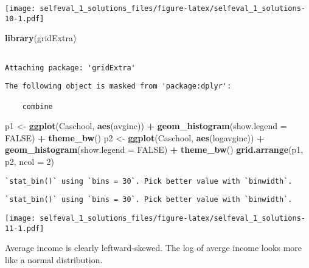 \documentclass[12pt,]{article}
\newenvironment{Shaded}{\begin{snugshade}}{\end{snugshade}}
\newcommand{\DataTypeTok}[1]{\textcolor[rgb]{0.13,0.29,0.53}{#1}}
\newcommand{\DecValTok}[1]{\textcolor[rgb]{0.00,0.00,0.81}{#1}}
\newcommand{\KeywordTok}[1]{\textcolor[rgb]{0.13,0.29,0.53}{\textbf{#1}}}
\newcommand{\NormalTok}[1]{#1}
\newcommand{\OperatorTok}[1]{\textcolor[rgb]{0.81,0.36,0.00}{\textbf{#1}}}
\newcommand{\OtherTok}[1]{\textcolor[rgb]{0.56,0.35,0.01}{#1}}
\newcommand{\StringTok}[1]{\textcolor[rgb]{0.31,0.60,0.02}{#1}}
\begin{document}
\texttt{[image: selfeval\_1\_solutions\_files/figure-latex/selfeval\_1\_solutions-10-1.pdf]}

\begin{Shaded}
\begin{Highlighting}[]
\KeywordTok{library}\NormalTok{(gridExtra)}
\end{Highlighting}
\end{Shaded}

\begin{verbatim}

Attaching package: 'gridExtra'
\end{verbatim}

\begin{verbatim}
The following object is masked from 'package:dplyr':

    combine
\end{verbatim}

\begin{Shaded}
\begin{Highlighting}[]
\NormalTok{p1 <-}\StringTok{ }\KeywordTok{ggplot}\NormalTok{(Caschool, }\KeywordTok{aes}\NormalTok{(avginc)) }\OperatorTok{+}
\StringTok{  }\KeywordTok{geom_histogram}\NormalTok{(}\DataTypeTok{show.legend =} \OtherTok{FALSE}\NormalTok{) }\OperatorTok{+}
\StringTok{  }\KeywordTok{theme_bw}\NormalTok{()}
\NormalTok{p2 <-}\StringTok{ }\KeywordTok{ggplot}\NormalTok{(Caschool, }\KeywordTok{aes}\NormalTok{(logavginc)) }\OperatorTok{+}
\StringTok{  }\KeywordTok{geom_histogram}\NormalTok{(}\DataTypeTok{show.legend =} \OtherTok{FALSE}\NormalTok{) }\OperatorTok{+}
\StringTok{  }\KeywordTok{theme_bw}\NormalTok{()}
\KeywordTok{grid.arrange}\NormalTok{(p1, p2,  }
             \DataTypeTok{ncol =} \DecValTok{2}\NormalTok{)  }
\end{Highlighting}
\end{Shaded}

\begin{verbatim}
`stat_bin()` using `bins = 30`. Pick better value with `binwidth`.
\end{verbatim}

\begin{verbatim}
`stat_bin()` using `bins = 30`. Pick better value with `binwidth`.
\end{verbatim}

\texttt{[image: selfeval\_1\_solutions\_files/figure-latex/selfeval\_1\_solutions-11-1.pdf]}

Average income is clearly leftward-skewed. The log of averge income
looks more like a normal distribution.
\end{document}
